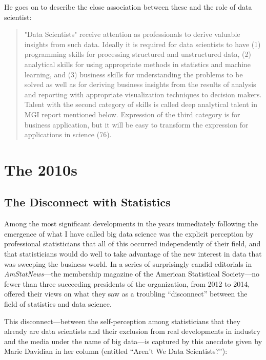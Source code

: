 \documentclass[
  letterpaper,
]{report}
\begin{document}
He goes on to describe the close association between these and the role
of data scientist:

\begin{quote}
"Data Scientists" receive attention as professionals to derive valuable
insights from such data. Ideally it is required for data scientists to
have (1) programming skills for processing structured and unstructured
data, (2) analytical skills for using appropriate methods in statistics
and machine learning, and (3) business skills for understanding the
problems to be solved as well as for deriving business insights from the
results of analysis and reporting with appropriate visualization
techniques to decision makers. Talent with the second category of skills
is called deep analytical talent in MGI report mentioned below.
Expression of the third category is for business application, but it
will be easy to transform the expression for applications in science
(76).
\end{quote}

\hypertarget{the-2010s}{%
\chapter{The 2010s}\label{the-2010s}}

\hypertarget{the-disconnect-with-statistics}{%
\section{The Disconnect with
Statistics}\label{the-disconnect-with-statistics}}

Among the most significant developments in the years immediately
following the emergence of what I have called big data science was the
explicit perception by professional statisticians that all of this
occurred independently of their field, and that statisticians would do
well to take advantage of the new interest in data that was sweeping the
business world. In a series of surprisingly candid editorials in
\emph{AmStatNews}---the membership magazine of the American Statistical
Society---no fewer than three succeeding presidents of the organization,
from 2012 to 2014, offered their views on what they saw as a troubling
``disconnect'' between the field of statistics and data science.

This disconnect---between the self-perception among statisticians that
they already are data scientists and their exclusion from real
developments in industry and the media under the name of big data---is
captured by this anecdote given by Marie Davidian in her column
(entitled ``Aren't We Data Scientists?''):
\end{document}
